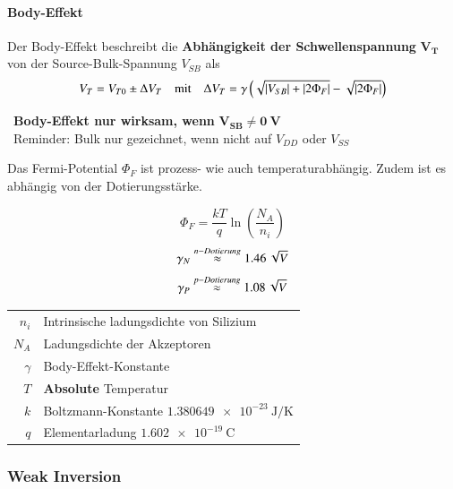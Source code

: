 \paragraph{Body-Effekt}
Der Body-Effekt beschreibt die \textbf{Abhängigkeit der Schwellenspannung} $\bm{V_T}$ von der Source-Bulk-Spannung $V_{SB}$ als
$$ V_T = V_{T0} \pm \Delta V_T \quad \text{mit} \quad \Delta V_T = \gamma\left(\sqrt{\left|V_{SB}\right| + \left|2\Phi_F\right|}-\sqrt{\left|2\Phi_F\right|}\right)$$

\rightarrow\ \textbf{Body-Effekt nur wirksam, wenn} $\mathbf{V_{SB} \neq \qty{0}{\volt}}$ \\
\rightarrow\ Reminder: Bulk nur gezeichnet, wenn nicht auf $V_{DD}$ oder $V_{SS}$

\medskip

Das Fermi-Potential $\Phi_F$ ist prozess- wie auch temperaturabhängig. Zudem ist es abhängig von der Dotierungsstärke.

\begin{minipage}[c]{0.3\columnwidth}
    $$ \Phi_F = \frac{kT}{q} \ln \left( \frac{N_A}{n_i} \right) $$
    $$ \gamma_N \overset{n-Dotierung}{\approx} \qty{1.46}{\sqrt{\volt}} $$
    $$ \gamma_P \overset{p-Dotierung}{\approx} \qty{1.08}{\sqrt{\volt}} $$
\end{minipage}
\hfill
\begin{minipage}[c]{0.68\columnwidth}
    \begin{tabular}{rl}
        $n_i$       & Intrinsische ladungsdichte von Silizium   \\
        $N_A$       & Ladungsdichte der Akzeptoren              \\
        $\gamma$    & Body-Effekt-Konstante                     \\
        $T$         & \textbf{Absolute} Temperatur              \\
        $k$         & Boltzmann-Konstante $\qty{1.380649 e-23}{\joule\per\kelvin}$  \\
        $q$         & Elementarladung $\qty{1.602 e-19}{\coulomb}$
    \end{tabular}
\end{minipage}


\subsubsection{Weak Inversion}

\vspace{-0.3cm}

